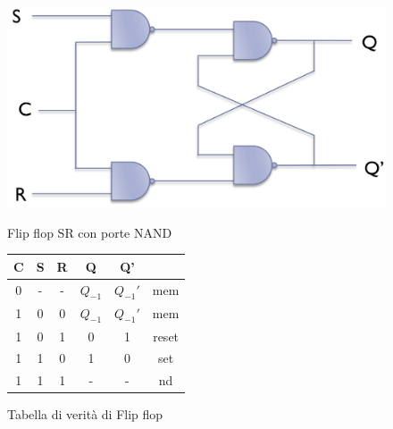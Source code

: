 \begin{figure}[htbp]
    \begin{minipage}[htbp]{0.5\textwidth}
    \centering
        \includegraphics[width=0.9\linewidth]{FFSRC.png}
        \caption{Flip flop SR con porte NAND}
    \end{minipage}
    \begin{minipage}[htbp]{0.5\textwidth}
    \centering

    \begin{tabular}{ccc|ccc}
        C & S & R & Q & Q' & \\
        \hline
        0 & - & - & $Q_{-1}$ & $Q_{-1}'$ & mem\\
        1 & 0 & 0 & $Q_{-1}$ & $Q_{-1}'$ & mem\\
        1 & 0 & 1 & 0 & 1 & reset\\
        1&  1&  0&  1& 0 &set \\
        1 & 1 &  1&  -& - &nd \\
    \end{tabular}
    \caption{Tabella di verità di Flip flop}
    
    \end{minipage}
\end{figure}







